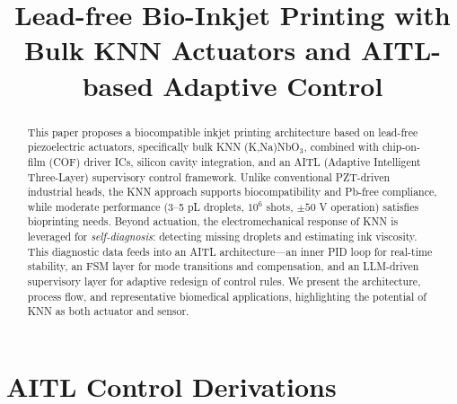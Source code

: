 \documentclass[conference]{IEEEtran}
\title{Lead-free Bio-Inkjet Printing with Bulk KNN Actuators and AITL-based Adaptive Control}
\author{%
  \IEEEauthorblockN{Shinichi Samizo}
  \IEEEauthorblockA{Independent Semiconductor Researcher\\
  Former Engineer at Seiko Epson Corporation\\
  Email: \href{mailto:shin3t72@gmail.com}{shin3t72@gmail.com}\\
  GitHub: \url{https://github.com/Samizo-AITL}}%
}
\begin{document}
\maketitle

\begin{abstract}
This paper proposes a biocompatible inkjet printing architecture based on
lead-free piezoelectric actuators, specifically bulk KNN (K,Na)NbO$_3$, combined
with chip-on-film (COF) driver ICs, silicon cavity integration, and
an AITL (Adaptive Intelligent Three-Layer) supervisory control framework.
Unlike conventional PZT-driven industrial heads, the KNN approach supports
biocompatibility and Pb-free compliance, while moderate performance
(3--5 pL droplets, $10^6$ shots, $\pm50$ V operation) satisfies bioprinting needs.
Beyond actuation, the electromechanical response of KNN is leveraged for
\emph{self-diagnosis}: detecting missing droplets and estimating ink viscosity.
This diagnostic data feeds into an AITL architecture---an inner PID loop for
real-time stability, an FSM layer for mode transitions and compensation,
and an LLM-driven supervisory layer for adaptive redesign of control rules.
We present the architecture, process flow, and representative biomedical
applications, highlighting the potential of KNN as both actuator and sensor.
\end{abstract}







\vspace{1em}

\appendices
\section{AITL Control Derivations}


\vspace{1em}
\end{document}
